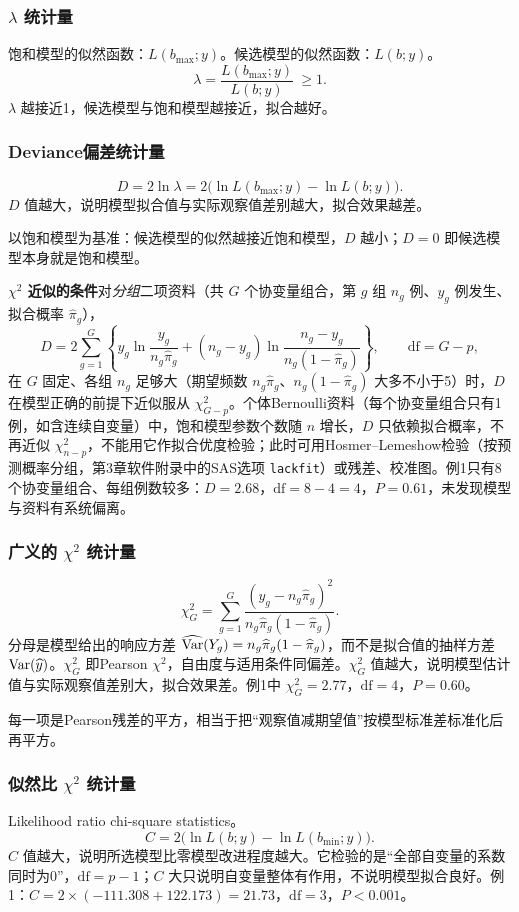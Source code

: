 \subsubsection{$\lambda$ 统计量}
饱和模型的似然函数：$L(b_{\max};y)$。候选模型的似然函数：$L(b;y)$。
\[
\lambda=\frac{L(b_{\max};y)}{L(b;y)}\ \ge1.
\]
$\lambda$ 越接近1，候选模型与饱和模型越接近，拟合越好。
\subsubsection{Deviance偏差统计量}
\[
D=2\ln\lambda=2\bigl(\ln L(b_{\max};y)-\ln L(b;y)\bigr).
\]
$D$ 值越大，说明模型拟合值与实际观察值差别越大，拟合效果越差。
\begin{annotation}以饱和模型为基准：候选模型的似然越接近饱和模型，$D$ 越小；$D=0$ 即候选模型本身就是饱和模型。\end{annotation}
\textbf{$\chi^2$ 近似的条件}\quad 对\emph{分组}二项资料（共 $G$ 个协变量组合，第 $g$ 组 $n_g$ 例、$y_g$ 例发生、拟合概率 $\widehat\pi_g$），
\[
D=2\sum_{g=1}^G\left\{y_g\ln\frac{y_g}{n_g\widehat\pi_g}+(n_g-y_g)\ln\frac{n_g-y_g}{n_g(1-\widehat\pi_g)}\right\},\qquad \mathrm{df}=G-p,
\]
在 $G$ 固定、各组 $n_g$ 足够大（期望频数 $n_g\widehat\pi_g$、$n_g(1-\widehat\pi_g)$ 大多不小于5）时，$D$ 在模型正确的前提下近似服从 $\chi^2_{G-p}$。个体Bernoulli资料（每个协变量组合只有1例，如含连续自变量）中，饱和模型参数个数随 $n$ 增长，$D$ 只依赖拟合概率，不再近似 $\chi^2_{n-p}$，不能用它作拟合优度检验；此时可用Hosmer--Lemeshow检验（按预测概率分组，第3章软件附录中的SAS选项 \texttt{lackfit}）或残差、校准图。例1只有8个协变量组合、每组例数较多：$D=2.68$，$\mathrm{df}=8-4=4$，$P=0.61$，未发现模型与资料有系统偏离。
\subsubsection{广义的 $\chi^2$ 统计量}
\[
\chi_G^2=\sum_{g=1}^G\frac{(y_g-n_g\widehat\pi_g)^2}{n_g\widehat\pi_g(1-\widehat\pi_g)}.
\]
分母是模型给出的响应方差 $\widehat{\operatorname{Var}}(Y_g)=n_g\widehat\pi_g(1-\widehat\pi_g)$，而不是拟合值的抽样方差 $\operatorname{Var}(\widehat y)$。$\chi_G^2$ 即Pearson $\chi^2$，自由度与适用条件同偏差。$\chi_G^2$ 值越大，说明模型估计值与实际观察值差别大，拟合效果差。例1中 $\chi_G^2=2.77$，$\mathrm{df}=4$，$P=0.60$。
\begin{annotation}每一项是Pearson残差的平方，相当于把“观察值减期望值”按模型标准差标准化后再平方。\end{annotation}
\subsubsection{似然比 $\chi^2$ 统计量}
Likelihood ratio chi-square statistics。
\[
C=2\bigl(\ln L(b;y)-\ln L(b_{\min};y)\bigr).
\]
$C$ 值越大，说明所选模型比零模型改进程度越大。它检验的是“全部自变量的系数同时为0”，$\mathrm{df}=p-1$；$C$ 大只说明自变量整体有作用，不说明模型拟合良好。例1：$C=2\times(-111.308+122.173)=21.73$，$\mathrm{df}=3$，$P<0.001$。
